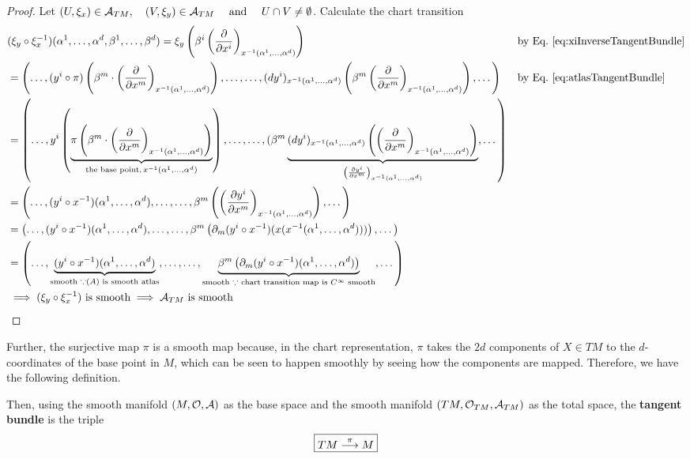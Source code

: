 \begin{proof}
Let $(U,\xi_x) \in \A_{TM}, \quad (V,\xi_y) \in \A_{TM} \quad \text{ and } \quad U \cap V \ne \emptyset$. Calculate the chart transition
\begin{align*}
& (\xi_y \after \xi_x^{-1})(\alpha^1, \dotsc, \alpha^d, \beta^1, \dotsc, \beta^d) = \xi_y \left(\beta^i \left(\cibasis{x^i} \right)_{x^{-1}(\alpha^1, \dotsc, \alpha^d)}\right) && \text{by Eq.~\ref{eq:xiInverseTangentBundle}} \\
& = \left(\dotsc, (y^i \after \pi)\left(\beta^m \cdot \left(\cibasis{x^m}\right)_{x^{-1}(\alpha^1, \dotsc, \alpha^d)}\right), \dotsc, \dotsc, (dy^i)_{x^{-1}(\alpha^1, \dotsc, \alpha^d)} \left(\beta^m \left(\cibasis{x^m} \right)_{x^{-1}(\alpha^1, \dotsc, \alpha^d)} \right), \dotsc \right) && \text{by Eq.~\ref{eq:atlasTangentBundle}}  \\
& = \left(\dotsc, y^i \left(\underbrace{\pi\left(\beta^m \cdot \left(\cibasis{x^m}\right)_{x^{-1}(\alpha^1, \dotsc, \alpha^d)}\right)}_{\text{the base point,}\, x^{-1}(\alpha^1, \dotsc, \alpha^d)}\right), \dotsc, \dotsc, (\beta^m \underbrace{(dy^i)_{x^{-1} (\alpha^1, \dotsc, \alpha^d)} \left( \left(\cibasis{x^m}\right)_{x^{-1}(\alpha^1, \dotsc, \alpha^d)} \right)}_{\left(\cibasis[y^i]{x^m}\right)_{x^{-1}(\alpha^1, \dotsc, \alpha^d)}}, \dotsc \right) \\
& = \left(\dotsc, (y^i \after x^{-1})(\alpha^1, \dotsc, \alpha^d), \dotsc, \dotsc, \beta^m \left(\left(\cibasis[y^i]{x^m}\right)_{x^{-1}(\alpha^1, \dotsc, \alpha^d)} \right), \dotsc\right) \\
& = \left(\dotsc, (y^i \after x^{-1})(\alpha^1, \dotsc, \alpha^d), \dotsc, \dotsc, \beta^m \left(\partial_m (y^i \after x^{-1})( x (x^{-1}(\alpha^1, \dotsc, \alpha^d))) \right), \dotsc\right) \\
& = \left(\dotsc, \underbrace{(y^i \after x^{-1})(\alpha^1, \dotsc, \alpha^d)}_{\text{smooth } \because \mathcal(A) \text{ is smooth atlas}}, \dotsc, \dotsc, \underbrace{\beta^m \left(\partial_m (y^i \after x^{-1})(\alpha^1, \dotsc, \alpha^d)\right)}_{\text{smooth } \because \text{ chart transition map is } C^\infty \text{ smooth}}, \dotsc\right) \\
& \implies (\xi_y \after \xi_x^{-1}) \text{ is smooth} \implies \A_{TM} \text{ is smooth}
\end{align*}
\end{proof}

Further, the surjective map $\pi$ is a smooth map because, in the chart representation, $\pi$ takes the $2d$ components of $X \in TM$ to the $d$-coordinates of the base point in $M$, which can be seen to happen smoothly by seeing how the components are mapped. Therefore, we have the following definition. 
\begin{definition}
Then, using the smooth manifold $\mfd$ as the base space and the smooth manifold $(TM, \mathcal{O}_{TM}, \A_{TM})$ as the total space, the \textbf{tangent bundle} is the triple
\begin{equation}\label{eq:TangentBundle}
\boxed{TM \projmapto M}
\end{equation}
\end{definition}

